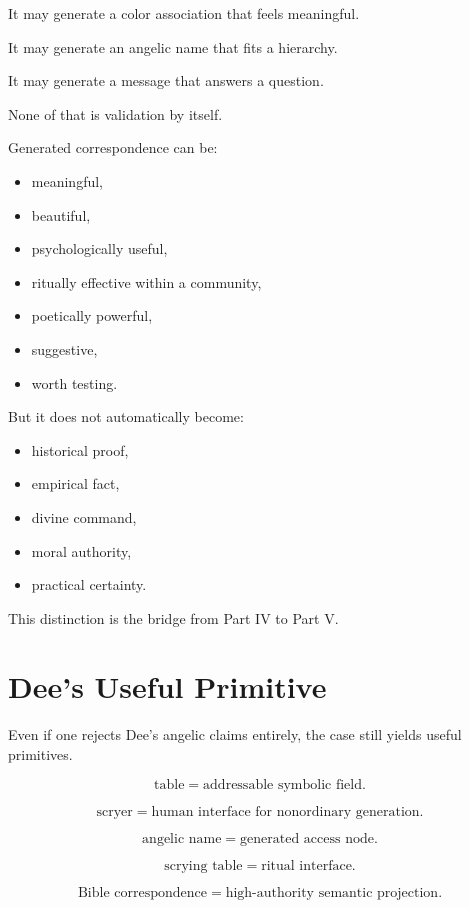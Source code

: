 \documentclass[11pt]{book}
\begin{document}
It may generate a color association that feels meaningful.

It may generate an angelic name that fits a hierarchy.

It may generate a message that answers a question.

None of that is validation by itself.

Generated correspondence can be:

\begin{itemize}
    \item meaningful,
    \item beautiful,
    \item psychologically useful,
    \item ritually effective within a community,
    \item poetically powerful,
    \item suggestive,
    \item worth testing.
\end{itemize}

But it does not automatically become:

\begin{itemize}
    \item historical proof,
    \item empirical fact,
    \item divine command,
    \item moral authority,
    \item practical certainty.
\end{itemize}

This distinction is the bridge from Part IV to Part V.

\section{Dee's Useful Primitive}

Even if one rejects Dee's angelic claims entirely, the case still yields useful primitives.

\[
\text{table} = \text{addressable symbolic field}.
\]

\[
\text{scryer} = \text{human interface for nonordinary generation}.
\]

\[
\text{angelic name} = \text{generated access node}.
\]

\[
\text{scrying table} = \text{ritual interface}.
\]

\[
\text{Bible correspondence} = \text{high-authority semantic projection}.
\]
\end{document}
